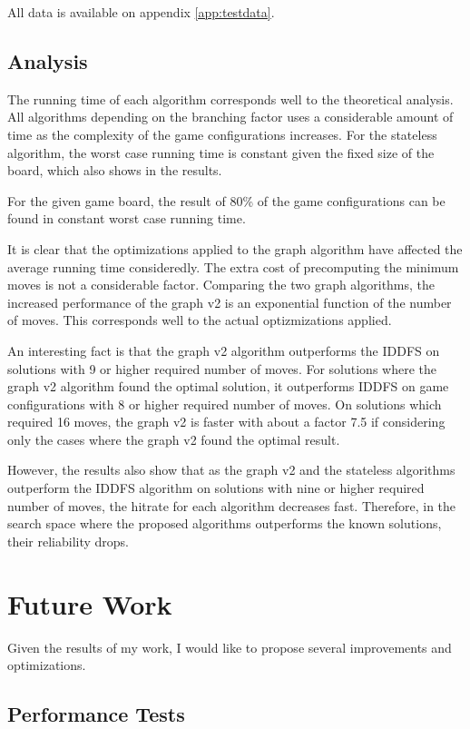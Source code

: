 \documentclass[]{article}
\begin{document}
All data is available on appendix \ref{app:testdata}.

\subsection{Analysis}\label{analysis-3}

The running time of each algorithm corresponds well to the theoretical
analysis. All algorithms depending on the branching factor uses a
considerable amount of time as the complexity of the game configurations
increases. For the stateless algorithm, the worst case running time is
constant given the fixed size of the board, which also shows in the
results.

For the given game board, the result of 80\% of the game configurations
can be found in constant worst case running time.

It is clear that the optimizations applied to the graph algorithm have
affected the average running time consideredly. The extra cost of
precomputing the minimum moves is not a considerable factor. Comparing
the two graph algorithms, the increased performance of the graph v2 is
an exponential function of the number of moves. This corresponds well to
the actual optizmizations applied.

An interesting fact is that the graph v2 algorithm outperforms the IDDFS
on solutions with 9 or higher required number of moves. For solutions
where the graph v2 algorithm found the optimal solution, it outperforms
IDDFS on game configurations with 8 or higher required number of moves.
On solutions which required 16 moves, the graph v2 is faster with about
a factor 7.5 if considering only the cases where the graph v2 found the
optimal result.

However, the results also show that as the graph v2 and the stateless
algorithms outperform the IDDFS algorithm on solutions with nine or
higher required number of moves, the hitrate for each algorithm
decreases fast. Therefore, in the search space where the proposed
algorithms outperforms the known solutions, their reliability drops.

\section{Future Work}\label{future-work}

Given the results of my work, I would like to propose several
improvements and optimizations.

\subsection{Performance Tests}\label{performance-tests}
\end{document}
